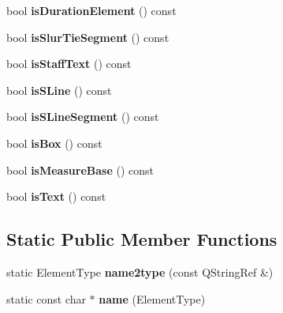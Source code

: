 \begin{DoxyCompactItemize}
bool {\bfseries is\+Duration\+Element} () const
\item 
\mbox{\label{class_ms_1_1_score_element_a372dfc0678c5194028e61b6a9a24ab62}} 
bool {\bfseries is\+Slur\+Tie\+Segment} () const
\item 
\mbox{\label{class_ms_1_1_score_element_a2a2f39185cea69203227cdbbf781f402}} 
bool {\bfseries is\+Staff\+Text} () const
\item 
\mbox{\label{class_ms_1_1_score_element_a4de90a044cdd2a7030d707f2b081c8a4}} 
bool {\bfseries is\+S\+Line} () const
\item 
\mbox{\label{class_ms_1_1_score_element_acf35020b5e670ac13791697e65b679d4}} 
bool {\bfseries is\+S\+Line\+Segment} () const
\item 
\mbox{\label{class_ms_1_1_score_element_a997e1063786d8c705c74b3d66c54f269}} 
bool {\bfseries is\+Box} () const
\item 
\mbox{\label{class_ms_1_1_score_element_a06e5d7c169bf6eb01f5f723cbdae973f}} 
bool {\bfseries is\+Measure\+Base} () const
\item 
\mbox{\label{class_ms_1_1_score_element_a979c3d0bfaab90c64947e709eca66371}} 
bool {\bfseries is\+Text} () const
\end{DoxyCompactItemize}
\subsection*{Static Public Member Functions}
\begin{DoxyCompactItemize}
\item 
\mbox{\label{class_ms_1_1_score_element_a3a355967d09b12bbce9e361e5c7f32cb}} 
static Element\+Type {\bfseries name2type} (const Q\+String\+Ref \&)
\item 
\mbox{\label{class_ms_1_1_score_element_ab6ded8e7ff6dcb45db0036a57f9f9d26}} 
static const char $\ast$ {\bfseries name} (Element\+Type)
\end{DoxyCompactItemize}
